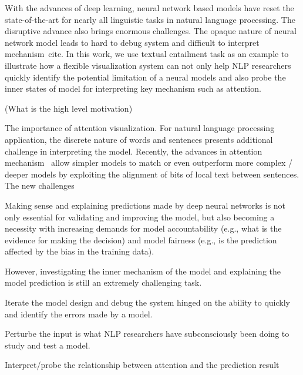 \maketitle

With the advances of deep learning, neural network based models have reset the state-of-the-art for nearly all linguistic tasks in natural language processing. The disruptive advance also brings enormous challenges. The opaque nature of neural network model leads to hard to debug system and difficult to interpret mechanism~cite{}. In this work, we use textual entailment task as an example to illustrate how a flexible visualization system can not only help NLP researchers quickly identify the potential limitation of a neural models and also probe the inner states of model for interpreting key mechanism such as attention.


(What is the high level motivation)

The importance of attention visualization.
For natural language processing application, the discrete nature of words and sentences presents additional challenge in interpreting the model. Recently, the advances in attention mechanism~\cite{} allow simpler models to match or even outperform more complex / deeper models by exploiting the alignment of bits of local text between sentences. The new challenges


Making sense and explaining predictions made by deep neural networks is not only essential for validating and improving the model, but also becoming a necessity with increasing demands for model accountability (e.g., what is the evidence for making the decision) and model fairness (e.g., is the prediction affected by the bias in the training data).

However, investigating the inner mechanism of the model and explaining the model prediction is still an extremely challenging task.

Iterate the model design and debug the system hinged on the ability to quickly and identify the errors made by a model.

Perturbe the input is what NLP researchers have subconsciously been doing to study and test a model.

Interpret/probe the relationship between attention and the prediction result


